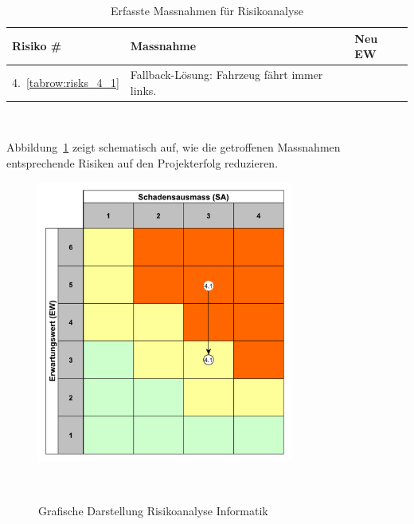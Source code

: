 \documentclass[main.tex]{subfiles} %
\begin{document}
\begin{table}[H]
    \begin{tabularx}{\textwidth}{|>{\centering\arraybackslash}p{2cm}|>{\raggedright\arraybackslash}X|>{\centering\arraybackslash}p{0.75cm}|}
        \hline
        \textbf{Risiko \#}        & \textbf{Massnahme}
                                  & \textbf{Neu EW}                              \\

        \hline
        \rowcolor{yellow!30}
        4.~\ref{tabrow:risks_4_1} & Fallback-Lösung: Fahrzeug fährt immer links.
                                  & 3                                            \\

        \hline

    \end{tabularx}
    \caption{Erfasste Massnahmen für Risikoanalyse}~\label{tab:Erfasste_Massnahmen_info}
\end{table}

Abbildung~\ref{fig:Diagramm_Risiko_info} zeigt schematisch auf, wie die
getroffenen Massnahmen entsprechende Risiken auf den Projekterfolg reduzieren.

\begin{figure}[h]
    \centering
    \includegraphics[width=0.75\textwidth]{./fig_Risikomanagement/Diagramm_Risiko_info.pdf}
    \caption{Grafische Darstellung Risikoanalyse Informatik}~\label{fig:Diagramm_Risiko_info}
\end{figure}
\end{document}
